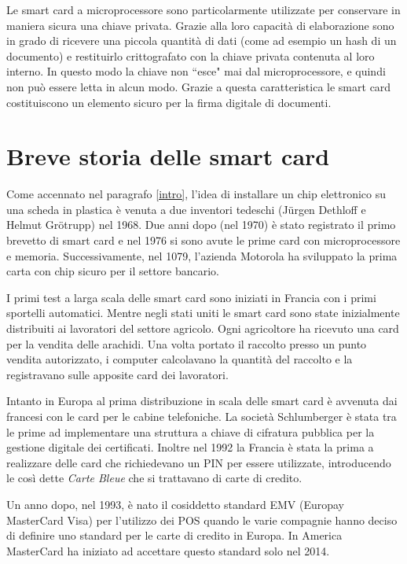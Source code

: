 Le smart card a microprocessore sono particolarmente utilizzate per conservare in maniera sicura una chiave privata. Grazie alla loro capacità di elaborazione sono in grado di ricevere una piccola quantità di dati (come ad esempio un hash di un documento) e restituirlo crittografato con la chiave privata contenuta al loro interno. In questo modo la chiave non ``esce" mai dal microprocessore, e quindi non può essere letta in alcun modo. Grazie a questa caratteristica le smart card costituiscono un elemento sicuro per la firma digitale di documenti.
\cite{wiki_sc}

\section{Breve storia delle smart card}
Come accennato nel paragrafo \ref{intro}, l'idea di installare un chip elettronico su una scheda in plastica è venuta a due inventori tedeschi (Jürgen Dethloff e Helmut Grötrupp) nel 1968. Due anni dopo (nel 1970) è stato registrato il primo brevetto di smart card e nel 1976 si sono avute le prime card con microprocessore e memoria. Successivamente, nel 1079, l'azienda Motorola ha sviluppato la prima carta con chip sicuro per il settore bancario.

I primi test a larga scala delle smart card sono iniziati in Francia con i primi sportelli automatici. Mentre negli stati uniti le smart card sono state inizialmente distribuiti ai lavoratori del settore agricolo. Ogni agricoltore ha ricevuto una card per la vendita delle arachidi. Una volta portato il raccolto presso un punto vendita autorizzato, i computer calcolavano la quantità del raccolto e la registravano sulle apposite card dei lavoratori.

Intanto in Europa al prima distribuzione in scala delle smart card è avvenuta dai francesi con le card per le cabine telefoniche. La società Schlumberger è stata tra le prime ad implementare una struttura a chiave di cifratura pubblica per la gestione digitale dei certificati. Inoltre nel 1992 la Francia è stata la prima a realizzare delle card che richiedevano un PIN per essere utilizzate, introducendo le così dette  \textit{Carte Bleue} che si trattavano di carte di credito.

Un anno dopo, nel 1993, è nato il cosiddetto standard EMV (Europay MasterCard Visa) per l'utilizzo dei POS quando le varie compagnie hanno deciso di definire uno standard per le carte di credito in Europa. In America MasterCard ha iniziato ad accettare questo standard solo nel 2014.
\cite{history}

